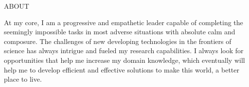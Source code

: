\documentclass{resume} %
\begin{document}

\begin{rSection}{\Large ABOUT}

{At my core, I am a progressive and empathetic leader capable of completing the seemingly impossible tasks in most adverse situations with absolute calm and composure. The challenges of new developing technologies in the frontiers of science has always intrigue and fueled my research capabilities. I always look for opportunities that help me increase my domain knowledge, which eventually will help me to develop efficient and effective solutions to make this world, a better place to live.}
\vspace{-4px}

\end{rSection}
\end{document}
